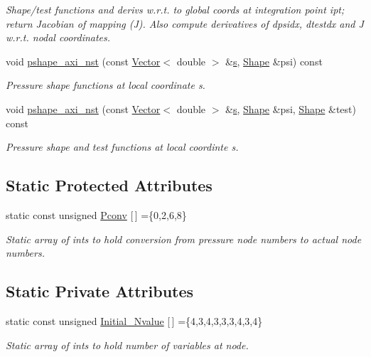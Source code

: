 \begin{DoxyCompactItemize}
\begin{DoxyCompactList}\small\item\em Shape/test functions and derivs w.\+r.\+t. to global coords at integration point ipt; return Jacobian of mapping (J). Also compute derivatives of dpsidx, dtestdx and J w.\+r.\+t. nodal coordinates. \end{DoxyCompactList}\item 
void \hyperlink{classoomph_1_1AxisymmetricQTaylorHoodElement_ab4eea01cdcd97616ce75e6547c0c4338}{pshape\+\_\+axi\+\_\+nst} (const \hyperlink{classoomph_1_1Vector}{Vector}$<$ double $>$ \&\hyperlink{cfortran_8h_ab7123126e4885ef647dd9c6e3807a21c}{s}, \hyperlink{classoomph_1_1Shape}{Shape} \&psi) const
\begin{DoxyCompactList}\small\item\em Pressure shape functions at local coordinate s. \end{DoxyCompactList}\item 
void \hyperlink{classoomph_1_1AxisymmetricQTaylorHoodElement_abdb9779d344d9dbe51260e8d01852737}{pshape\+\_\+axi\+\_\+nst} (const \hyperlink{classoomph_1_1Vector}{Vector}$<$ double $>$ \&\hyperlink{cfortran_8h_ab7123126e4885ef647dd9c6e3807a21c}{s}, \hyperlink{classoomph_1_1Shape}{Shape} \&psi, \hyperlink{classoomph_1_1Shape}{Shape} \&test) const
\begin{DoxyCompactList}\small\item\em Pressure shape and test functions at local coordinte s. \end{DoxyCompactList}\end{DoxyCompactItemize}
\subsection*{Static Protected Attributes}
\begin{DoxyCompactItemize}
\item 
static const unsigned \hyperlink{classoomph_1_1AxisymmetricQTaylorHoodElement_a40720e74e6b8ce8d803ee95d7a6ad119}{Pconv} \mbox{[}$\,$\mbox{]} =\{0,2,6,8\}
\begin{DoxyCompactList}\small\item\em Static array of ints to hold conversion from pressure node numbers to actual node numbers. \end{DoxyCompactList}\end{DoxyCompactItemize}
\subsection*{Static Private Attributes}
\begin{DoxyCompactItemize}
\item 
static const unsigned \hyperlink{classoomph_1_1AxisymmetricQTaylorHoodElement_ae0826bd23cb739552135795de862c758}{Initial\+\_\+\+Nvalue} \mbox{[}$\,$\mbox{]} =\{4,3,4,3,3,3,4,3,4\}
\begin{DoxyCompactList}\small\item\em Static array of ints to hold number of variables at node. \end{DoxyCompactList}\end{DoxyCompactItemize}
